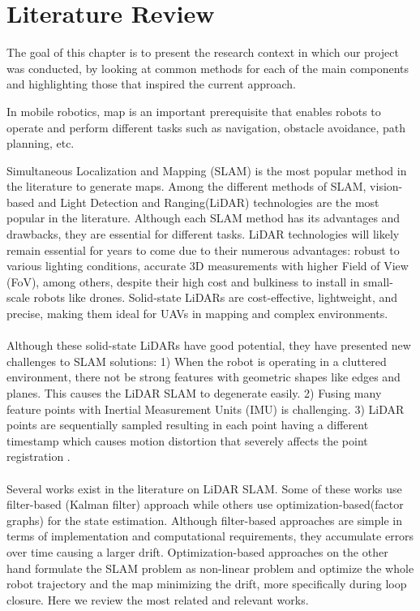 \chapter{Literature Review}
\label{ch:review}

The goal of this chapter is to present the research context in which our project was conducted, by looking at common methods for each of the main components and highlighting those that inspired the current approach.

In mobile robotics, map is an important prerequisite that enables robots to operate and perform different tasks such as navigation, obstacle avoidance, path planning, etc. \par \par  
\noindent Simultaneous Localization and Mapping (SLAM) is the most popular method in the literature to generate maps. Among the different methods of SLAM, vision-based and Light Detection and Ranging(LiDAR) technologies are the most popular in the literature. Although each SLAM method has its advantages and drawbacks, they are essential for different tasks. LiDAR technologies will likely remain essential for years to come due to their numerous advantages: robust to various lighting conditions, accurate 3D measurements with higher Field of View (FoV), among others, despite their high cost and bulkiness to install in small-scale robots like drones. Solid-state LiDARs are cost-effective, lightweight, and precise, making them ideal for UAVs in mapping and complex environments. 
\\ \\
Although these solid-state LiDARs have good potential, they have presented new challenges to SLAM solutions: 1) When the robot is operating in a cluttered environment, there not be strong features with geometric shapes like edges and planes. This causes the LiDAR SLAM to degenerate easily. 2) Fusing many feature points with Inertial Measurement Units (IMU) is challenging. 3) LiDAR points are sequentially sampled resulting in each point having a different timestamp which causes motion distortion that severely affects the point registration \cite{xu2021fastlio}.
\\ \\
Several works exist in the literature on LiDAR SLAM. Some of these works use filter-based (Kalman filter) approach while others use optimization-based(factor graphs) for the state estimation. Although filter-based approaches are simple in terms of implementation and computational requirements, they accumulate errors over time causing a larger drift. Optimization-based approaches on the other hand formulate the SLAM problem as non-linear problem and optimize the whole robot trajectory and the map minimizing the drift, more specifically during loop closure. Here we review the most related and relevant works.
